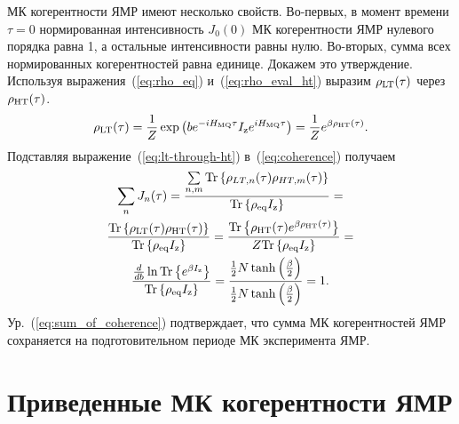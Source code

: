 МК когерентности ЯМР имеют несколько свойств.
Во-первых, в момент времени  $\tau=0$
нормированная интенсивность $J_0(0)$ МК когерентности ЯМР нулевого порядка равна 1,
а остальные интенсивности равны нулю.
Во-вторых, сумма всех нормированных когерентностей равна единице.
Докажем это утверждение.
Используя выражения~(\ref{eq:rho_eq}) и~(\ref{eq:rho_eval_ht})
выразим $\rho_\mathrm{LT}(\tau)$ через $\rho_\mathrm{HT}(\tau)$.
%
\begin{equation}\label{eq:lt-through-ht}
  \rho_\mathrm{LT}(\tau) = \dfrac 1 Z
  \exp\left(be^{-iH_\mathrm{MQ}\tau} I_\mathrm{z} e^{iH_\mathrm{MQ}\tau}\right) =
  \dfrac 1 Z e^{\beta\rho_\mathrm{HT}(\tau)}.
\end{equation}
%
Подставляя выражение~(\ref{eq:lt-through-ht}) в~(\ref{eq:coherence}) получаем
%
\begin{multline}\label{eq:sum_of_coherence}
  \sum\limits_n J_n(\tau) =
  \dfrac{\sum\limits_{n, m}\mathrm{Tr} \left\{ 
      \rho_{LT, n}(\tau)\rho_{HT, m}(\tau)
   \right\}}
  {\mathrm{Tr} \left\{ \rho_\mathrm{eq} I_\mathrm{z} \right\}} = \\
  \dfrac{\mathrm{Tr} \left\{ 
      \rho_\mathrm{LT}(\tau)\rho_\mathrm{HT}(\tau)
   \right\}}
  {\mathrm{Tr} \left\{ \rho_\mathrm{eq} I_\mathrm{z} \right\}} =
  \dfrac{\mathrm{Tr} \left\{ 
      \rho_\mathrm{HT}(\tau)e^{\beta\rho_\mathrm{HT}(\tau)}
   \right\}}
  {Z\mathrm{Tr} \left\{ \rho_\mathrm{eq} I_\mathrm{z} \right\}} = \\
  \dfrac{\frac{d}{db} \ln \mathrm{Tr} \left\{ 
      e^{\beta I_\mathrm{z}}
   \right\}}
  {\mathrm{Tr} \left\{ \rho_\mathrm{eq} I_\mathrm{z} \right\}} =
  \dfrac{\frac 1 2 N \tanh \left( \frac \beta 2 \right)}
  {\frac 1 2 N \tanh \left( \frac \beta 2 \right)} = 1.
\end{multline}
Ур.~(\ref{eq:sum_of_coherence}) подтверждает,
что сумма МК когерентностей ЯМР сохраняется на подготовительном периоде МК эксперимента ЯМР.


\section{Приведенные МК когерентности ЯМР}
\label{sec:reduced-mq-coherences}

